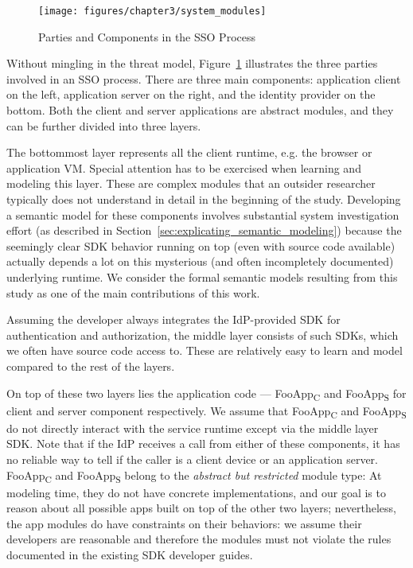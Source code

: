 \begin{figure}[hbt]
\centering
\texttt{[image: figures/chapter3/system\_modules]}
\caption{Parties and Components in the SSO Process}
\label{fig:system_modules}
\end{figure}

Without mingling in the threat model, Figure~\ref{fig:system_modules} illustrates the three parties involved in an SSO process. There are three main components: application client on the left, application server on the right, and the identity provider on the bottom.  Both the client and server applications are abstract modules, and they can be further divided into three layers.  

The bottommost layer represents all the client runtime, e.g. the browser or application VM.  Special attention has to be exercised when learning and modeling this layer.  These are complex modules that an outsider researcher typically does not understand in detail in the beginning of the study.  Developing a semantic model for these components involves substantial system investigation effort (as described in Section~\ref{sec:explicating_semantic_modeling}) because the seemingly clear SDK behavior running on top (even with source code available) actually depends a lot on this mysterious (and often incompletely documented) underlying runtime.  We consider the formal semantic models resulting from this study as one of the main contributions of this work.

Assuming the developer always integrates the IdP-provided SDK for authentication and authorization, the middle layer consists of such SDKs, which we often have source code access to.  These are relatively easy to learn and model compared to the rest of the layers.

On top of these two layers lies the application code --- FooApp\textsubscript{C} and FooApp\textsubscript{S} for client and server component respectively.  We assume that FooApp\textsubscript{C} and FooApp\textsubscript{S} do not directly interact with the service runtime except via the middle layer SDK.  Note that if the IdP receives a call from either of these components, it has no reliable way to tell if the caller is a client device or an application server.  FooApp\textsubscript{C} and FooApp\textsubscript{S} belong to the \emph{abstract but restricted} module type:  At modeling time, they do not have concrete implementations, and our goal is to reason about all possible apps built on top of the other two layers; nevertheless, the app modules do have constraints on their behaviors: we assume their developers are reasonable and therefore the modules must not violate the rules documented in the existing SDK developer guides.

